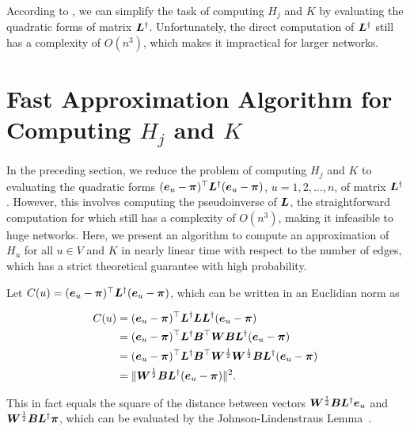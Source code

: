 \documentclass[10pt,journal,compsoc,twocolumn,twoside]{IEEEtran}
\begin{document}
According to , we can simplify the task of computing \(H_j\) and \(K\) by evaluating the quadratic forms of matrix \(\boldsymbol{L}^{\dagger}\).
Unfortunately, the direct computation of \(\boldsymbol{L}^{\dagger}\) still has a complexity of \(O(n^3)\), which makes it impractical for larger networks.

\section{Fast Approximation Algorithm for Computing \(H_j\) and \(K\)}\label{sec:approx-algo1}

In the preceding section, we reduce the problem of computing  \(H_j\) and \(K\) to evaluating the quadratic forms \((\boldsymbol{e}_u - \boldsymbol{\pi})^{\top} \boldsymbol{L}^{\dagger} (\boldsymbol{e}_u- \boldsymbol{\pi})\), \(u=1,2,\ldots, n\), of matrix  \(\boldsymbol{L}^{\dagger}\).
However,  this involves computing the pseudoinverse of \(\boldsymbol{L}\), the straightforward computation for which still has a complexity of \(O(n^3)\), making it infeasible to huge networks. Here, we present an algorithm to compute an approximation of \(H_u\) for all  \(u \in V\) and \(K\)  in nearly linear time with respect to the number of edges,  which has a strict theoretical guarantee with  high probability.

Let \(C(u)=(\boldsymbol{e}_u - \boldsymbol{\pi})^{\top} \boldsymbol{L}^{\dagger} (\boldsymbol{e}_u- \boldsymbol{\pi})\), which can be written in an Euclidian norm as
\begin{small}
    \begin{equation}\label{EE12}
        \begin{split}
            C(u)&=(\boldsymbol{e}_u - \boldsymbol{\pi})^{\top} \boldsymbol{L}^{\dagger} \boldsymbol{L} \boldsymbol{L}^{\dagger} (\boldsymbol{e}_u - \boldsymbol{\pi}) \\
            &=(\boldsymbol{e}_u - \boldsymbol{\pi})^{\top} \boldsymbol{L}^{\dagger} \boldsymbol{B}^{\top} \boldsymbol{W} \boldsymbol{B} \boldsymbol{L}^{\dagger} (\boldsymbol{e}_u - \boldsymbol{\pi}) \\
            &=(\boldsymbol{e}_u - \boldsymbol{\pi})^{\top} \boldsymbol{L}^{\dagger} \boldsymbol{B}^{\top} \boldsymbol{W}^{\frac{1}{2}} \boldsymbol{W}^{\frac{1}{2}} \boldsymbol{B} \boldsymbol{L}^{\dagger} (\boldsymbol{e}_u - \boldsymbol{\pi}) \\
            &=\|\boldsymbol{W}^{\frac{1}{2}} \boldsymbol{B} \boldsymbol{L}^{\dagger} (\boldsymbol{e}_u - \boldsymbol{\pi})\|^2.
        \end{split}
    \end{equation}
\end{small}
This  in fact  equals the square of the distance between  vectors  \(\boldsymbol{W}^{\frac{1}{2}} \boldsymbol{B} \boldsymbol{L}^{\dagger} \boldsymbol{e}_u\) and \(\boldsymbol{W}^{\frac{1}{2}} \boldsymbol{B} \boldsymbol{L}^{\dagger} \boldsymbol{\pi}\), which can be evaluated by the Johnson-Lindenstraus
Lemma~\cite{Ac01}.
\end{document}
